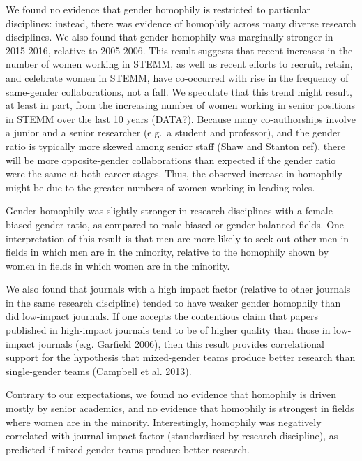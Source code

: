 \documentclass[12pt,]{article}
\begin{document}
We found no evidence that gender homophily is restricted to particular
disciplines: instead, there was evidence of homophily across many
diverse research disciplines. We also found that gender homophily was
marginally stronger in 2015-2016, relative to 2005-2006. This result
suggests that recent increases in the number of women working in STEMM,
as well as recent efforts to recruit, retain, and celebrate women in
STEMM, have co-occurred with rise in the frequency of same-gender
collaborations, not a fall. We speculate that this trend might result,
at least in part, from the increasing number of women working in senior
positions in STEMM over the last 10 years (DATA?). Because many
co-authorships involve a junior and a senior researcher (e.g.~a student
and professor), and the gender ratio is typically more skewed among
senior staff (Shaw and Stanton ref), there will be more opposite-gender
collaborations than expected if the gender ratio were the same at both
career stages. Thus, the observed increase in homophily might be due to
the greater numbers of women working in leading roles.

Gender homophily was slightly stronger in research disciplines with a
female-biased gender ratio, as compared to male-biased or
gender-balanced fields. One interpretation of this result is that men
are more likely to seek out other men in fields in which men are in the
minority, relative to the homophily shown by women in fields in which
women are in the minority.

We also found that journals with a high impact factor (relative to other
journals in the same research discipline) tended to have weaker gender
homophily than did low-impact journals. If one accepts the contentious
claim that papers published in high-impact journals tend to be of higher
quality than those in low-impact journals (e.g. Garfield 2006), then
this result provides correlational support for the hypothesis that
mixed-gender teams produce better research than single-gender teams
(Campbell et al. 2013).

Contrary to our expectations, we found no evidence that homophily is
driven mostly by senior academics, and no evidence that homophily is
strongest in fields where women are in the minority. Interestingly,
homophily was negatively correlated with journal impact factor
(standardised by research discipline), as predicted if mixed-gender
teams produce better research.
\end{document}
